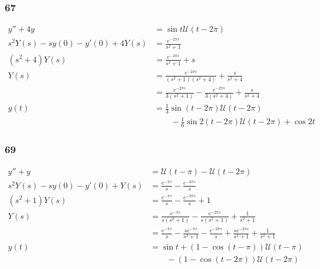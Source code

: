\documentclass{article}
\begin{document}
\subsubsection{67}

\begin{align*}
  y'' + 4 y                          & = \sin t \mathcal{U}(t - 2 \pi)                                                           \\
  s^2 Y(s) - s y(0) - y'(0) + 4 Y(s) & = \frac{e^{-2 \pi s}}{s^2 + 1}                                                            \\
  (s^2 + 4) Y(s)                     & = \frac{e^{-2 \pi s}}{s^2 + 1} + s                                                        \\
  Y(s)                               & = \frac{e^{-2 \pi s}}{(s^2 + 1) (s^2 + 4)} + \frac{s}{s^2 + 4}                            \\
                                     & = \frac{e^{-2 \pi s}}{3 (s^2 + 1)} - \frac{e^{-2 \pi s}}{3 (s^2 + 4)} + \frac{s}{s^2 + 4} \\
  y(t)                               & = \frac{1}{3} \sin (t - 2 \pi) \mathcal{U}(t - 2 \pi)                                     \\
                                     & \qquad - \frac{1}{6} \sin 2 (t - 2 \pi) \mathcal{U}(t - 2 \pi) + \cos 2 t
\end{align*}

\subsubsection{69}

\begin{align*}
  y'' + y                          & = \mathcal{U}(t - \pi) - \mathcal{U}(t - 2 \pi)                                                                                     \\
  s^2 Y(s) - s y(0) - y'(0) + Y(s) & = \frac{e^{-\pi s}}{s} - \frac{e^{-2 \pi s}}{s}                                                                                     \\
  (s^2 + 1) Y(s)                   & = \frac{e^{-\pi s}}{s} - \frac{e^{-2 \pi s}}{s} + 1                                                                                 \\
  Y(s)                             & = \frac{e^{-\pi s}}{s (s^2 + 1)} - \frac{e^{-2 \pi s}}{s (s^2 + 1)} + \frac{1}{s^2 + 1}                                             \\
                                   & = \frac{e^{-\pi s}}{s} - \frac{s e^{-\pi s}}{s^2 + 1} - \frac{e^{-2 \pi s}}{s} + \frac{s e^{-2 \pi s}}{s^2 + 1} + \frac{1}{s^2 + 1} \\
  y(t)                             & = \sin t + (1 - \cos (t - \pi)) \mathcal{U}(t - \pi)                                                                                \\
                                   & \qquad - (1 - \cos (t - 2 \pi)) \mathcal{U}(t - 2 \pi)                                                                              \\
\end{align*}
\end{document}

